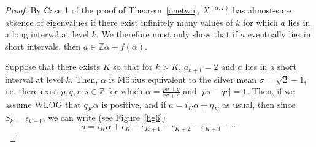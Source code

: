\documentclass[11pt,reqno]{amsart}
\theoremstyle{definition}
\theoremstyle{plain}
\begin{document}
\begin{proof}
By Case 1 of the proof of Theorem~\ref{onetwo}, $X^{(\alpha, I)}$ has almost-sure absence of eigenvalues if there exist infinitely many values of $k$ for which $a$ lies in a long interval at level $k$. We therefore must only show that if $a$ eventually lies in short intervals, then $a \in \mathbb{Z}\alpha + f(\alpha)$. 

Suppose that there exists $K$ so that for $k > K$, $a_{k+1} = 2$ and $a$ lies in a short interval at level $k$. Then, $\alpha$ is 
M\"{o}bius equivalent to the silver mean $\sigma = \sqrt{2} - 1$, i.e. there exist $p,q,r,s \in \mathbb{Z}$ for which $\alpha = \frac{p \sigma + q}{r \sigma + s}$ and $|ps - qr| = 1$. Then, if we assume WLOG that $q_K \alpha$ is positive, and if $a = i_K \alpha + \eta_K$ as usual, then since $S_k = \epsilon_{k-1}$, we can write (see Figure~\ref{fig6})
\[
a = i_K \alpha + \epsilon_K - \epsilon_{K+1} + \epsilon_{K+2} - \epsilon_{K+3} + \cdots
\]


\end{proof}
\end{document}
